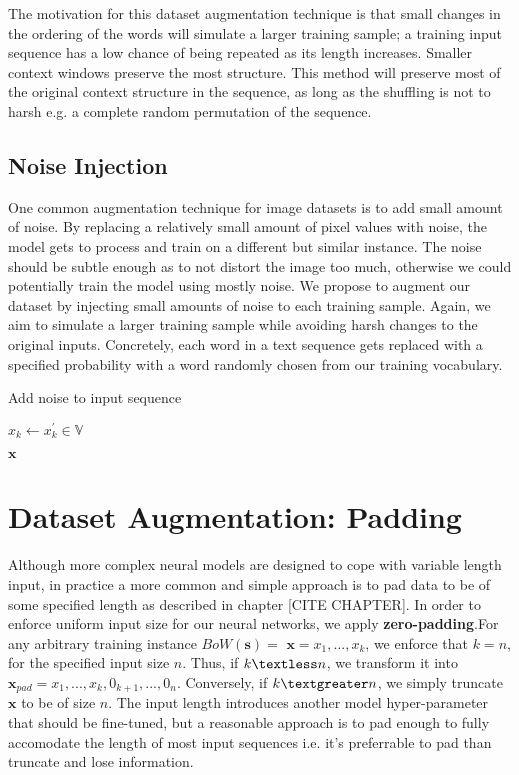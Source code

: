 The motivation for this dataset augmentation technique is that small changes in the ordering of the words will
simulate a larger training sample; a training input sequence has a low chance of being repeated as its
length increases. Smaller context windows preserve the most structure. This method will preserve
most of the original context structure in the sequence, as long as the shuffling is not to harsh e.g.
a complete random permutation of the sequence.

\subsection{Noise Injection}
One common augmentation technique for image datasets is to add small amount of noise. By replacing a relatively small
amount of pixel values with noise, the model gets to process and train on a different but similar instance. The noise should be subtle
enough as to not distort the image too much, otherwise we could potentially train the model using mostly noise.
We propose to augment our dataset by injecting small amounts of noise to each training sample. Again, we aim to simulate
a larger training sample while avoiding harsh changes to the original inputs. Concretely, each word in a text sequence gets replaced
with a specified probability with a word randomly chosen from our training vocabulary.
\begin{algorithm}[H]
\caption{Add noise to input sequence}
\begin{algorithmic}[1]
\State$x_k \gets x^{\prime}_k \in \mathbb{V}$
\EndIf
\EndFor

\Return $\bm{x}$
\EndProcedure
\end{algorithmic}
\end{algorithm}


\section{Dataset Augmentation: Padding}

Although more complex neural models are designed to cope with variable length input,
in practice a more common and simple approach is to pad data to be of some specified
length as described in chapter [CITE CHAPTER].
In order to enforce uniform input size for our neural networks,
we apply \textbf{zero-padding}.For any arbitrary training instance $BoW(\bm{s})=$ $\bm{x} = x_1,...,x_k$, we enforce that $k = n$, for the specified input size
$n$. Thus, if $k \textless n$, we transform it into $\bm{x}_{pad} = x_1,...,x_k, 0_{k+1}, ..., 0_{n}$. Conversely, if
$k \textgreater n$, we simply truncate $\bm{x}$ to be of size $n$. The input length introduces another model hyper-parameter
that should be fine-tuned, but a reasonable approach is to pad enough to fully accomodate
the length of most input sequences i.e. it’s preferrable to pad than truncate and lose
information.

